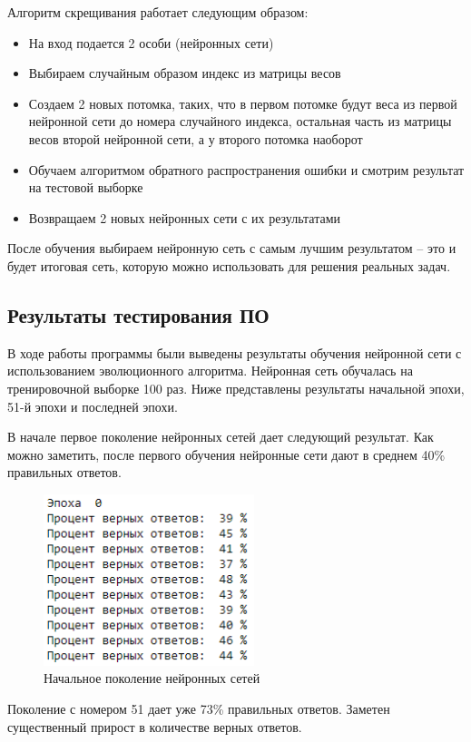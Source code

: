 Алгоритм скрещивания работает следующим образом:

\begin{itemize}
  \item На вход подается 2 особи (нейронных сети)
  \item Выбираем случайным образом индекс из матрицы весов
  \item Создаем 2 новых потомка, таких, что в первом потомке будут веса из первой нейронной сети до номера случайного индекса, остальная часть из матрицы весов второй нейронной сети, а у второго потомка наоборот
  \item Обучаем алгоритмом обратного распространения ошибки и смотрим результат на тестовой выборке
  \item Возвращаем 2 новых нейронных сети с их результатами
\end{itemize}

После обучения выбираем нейронную сеть с самым лучшим результатом – это и будет итоговая сеть, которую можно использовать для решения реальных задач.

\subsection*{Результаты тестирования ПО}

В ходе работы программы были выведены результаты обучения нейронной сети с использованием эволюционного алгоритма. Нейронная сеть обучалась на тренировочной выборке 100 раз. Ниже представлены результаты начальной эпохи, 51-й эпохи и последней эпохи.

В начале первое поколение нейронных сетей дает следующий результат. Как можно заметить, после первого обучения нейронные сети дают в среднем 40\% правильных ответов.

\begin{figure}[H]
  \centering
  \includegraphics[width=0.4\linewidth]{./img/first-epoch}
  \caption{Начальное поколение нейронных сетей}
  \label{fig:mpr} 
\end{figure}

Поколение с номером 51 дает уже 73\% правильных ответов. Заметен существенный прирост в количестве верных ответов.

